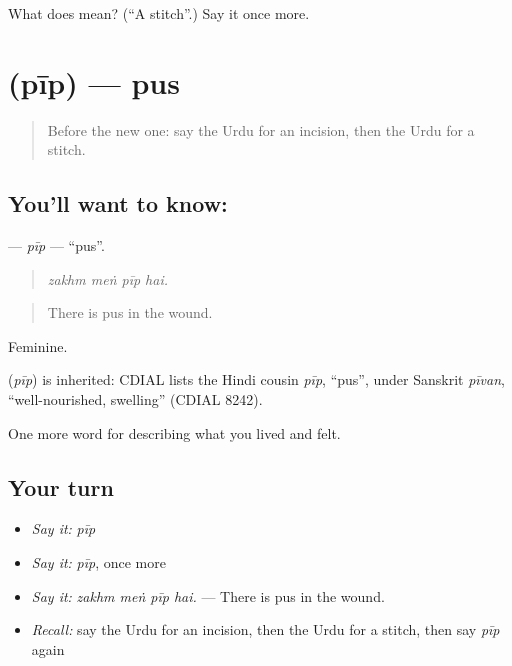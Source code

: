\begin{tcolorbox}[breakable,colback=teal!4,colframe=teal!35!black,title={Before you move on}]
What does  mean? (\textquotedblleft{}A stitch\textquotedblright{}.) Say it once more.
\end{tcolorbox}
\section[\texorpdfstring{\ur{پیپ} (pīp)}{پیپ (pīp)}]{ (pīp) — pus}

\label{lesson:UR-C478-pip}



\begin{quote}
Before the new one: say the Urdu for an incision, then the Urdu for a stitch.
\end{quote}

\subsection*{You'll want to know: }
\textbf{} — \emph{pīp} — \textquotedblleft{}pus\textquotedblright{}.

\begin{quote}
   
\end{quote}

\begin{quote}
\emph{zakhm meṅ pīp hai.}
\end{quote}

\begin{quote}
There is pus in the wound.
\end{quote}

Feminine.

\begin{cousinweb}
\textbf{} (\emph{pīp}) is inherited: CDIAL lists the Hindi cousin \emph{pīp}, \textquotedblleft{}pus\textquotedblright{}, under Sanskrit \emph{pīvan}, \textquotedblleft{}well-nourished, swelling\textquotedblright{} (CDIAL 8242).
\end{cousinweb}

\begin{grammarlens}[title={What you've built}]
One more word for describing what you lived and felt.
\end{grammarlens}

\subsection*{Your turn}
\begin{itemize}
\raggedright
  \item \emph{Say it:} \emph{pīp}
  \item \emph{Say it:} \emph{pīp}, once more
  \item \emph{Say it:} \emph{zakhm meṅ pīp hai.} — There is pus in the wound.
  \item \emph{Recall:} say the Urdu for an incision, then the Urdu for a stitch, then say \emph{pīp} again
\end{itemize}

